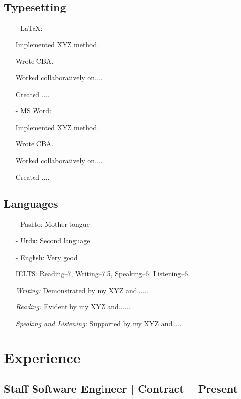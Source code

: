\documentclass[11pt]{article}
\begin{document}
    \subsection{Typesetting}
    \begin{itemize}
        \item[-] \textcolor{Sepia}{\LaTeX}: 
        \item[\checkmark] Implemented XYZ method. 
        \item[\checkmark] Wrote CBA. 
        \item[\checkmark] Worked collaboratively on.... 
        \item[\checkmark] Created ....
        \item[-] \textcolor{Sepia}{MS Word}:  
        \item[\checkmark] Implemented XYZ method. 
        \item[\checkmark] Wrote CBA. 
        \item[\checkmark] Worked collaboratively on.... 
        \item[\checkmark] Created ....
    \end{itemize}
    \subsection{Languages}
    \begin{itemize}
        \item[-] \textcolor{Sepia}{Pashto}: Mother tongue
        \item[-] \textcolor{Sepia}{Urdu}: Second language
        \item[-] \textcolor{Sepia}{English}: Very good
            \item[\checkmark] IELTS: Reading--7, Writing--7.5, Speaking--6, Listening--6.
            \item[\checkmark] \textit{Writing:}  Demonstrated by my XYZ and......
            \item[\checkmark] \textit{Reading:}  Evident by my XYZ and......
            \item[\checkmark] \textit{Speaking and Listening:} Supported by my XYZ and.....
        \end{itemize}
    
    \section{Experience}

    \subsection{Staff Software Engineer | Contract \hfill {} -- Present}
\end{document}
